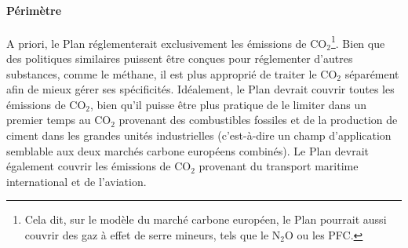 \documentclass[a5paper,french,openany]{memoir}
\begin{document}
\paragraph{Périmètre} 
A priori, le Plan réglementerait exclusivement les émissions de CO$_\text{2}$\footnote{Cela dit, sur le modèle du marché carbone européen, le Plan pourrait aussi couvrir des gaz à effet de serre mineurs, tels que le N$_\text{2}$O ou les PFC.}. Bien que des politiques similaires puissent être conçues pour réglementer d'autres substances, comme le méthane, il est plus approprié de traiter le CO$_\text{2}$ séparément afin de mieux gérer ses spécificités. Idéalement, le Plan devrait couvrir toutes les émissions de CO$_\text{2}$, bien qu'il puisse être plus pratique de le limiter dans un premier temps au CO$_\text{2}$ provenant des combustibles fossiles et de la production de ciment dans les grandes unités industrielles (c'est-à-dire un champ d'application semblable aux deux marchés carbone européens combinés). Le Plan devrait également couvrir les émissions de CO$_\text{2}$ provenant du transport maritime international et de l'aviation. 
\end{document}
